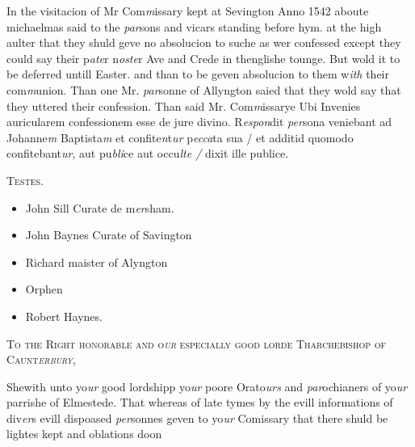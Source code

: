 \documentclass[12pt, a4paper]{book}
\begin{document}
            		
		\ifthenelse{\isodd{\thepage}}
		{\reversemarginpar}
		{\normalmarginpar}
		 In the visitacion of Mr Com\textit{m}issary kept at Sevington
 Anno 1542 aboute michaelmas said to the \textit{par}sons
 and vicars standing before hym. at the high aulter
 that they shuld geve no absolucion to suche as
 wer confessed except they could say their p\textit{ate}r n\textit{oste}r
 Ave and Crede in thenglishe tounge. But wold
  it to be deferred untill Easter. and than to be
 geven absolucion to them w\textit{ith} their com\textit{m}union.
            			Than one Mr. \textit{par}sonne of Allyngton saied that they
 wold say that they uttered their confession.
 Than said Mr. Com\textit{m}issarye Ubi Invenies
 auricularem confessionem esse de jure divino. R\textit{espon}dit
 \textit{per}sona veniebant ad Johanne\textit{m} Baptista\textit{m} et confite\textit{n}t\textit{ur}
 p\textit{ecca}ta sua / et additid quomodo confitebant\textit{ur}, aut
 pu\textit{bli}ce aut occu\textit{lte /} dixit ille publice.
            	

	\begin{center} {\scshape Testes.} \end{center}\begin{itemize}
		\item[]John Sill Curate de m\textit{er}sham.
		\item[]John Baynes Curate of Savington
		\item[]Richard maister of Alyngton
		\item[]Orphen
		\item[]Robert Haynes.\end{itemize}

 

            
            	
				\begin{center} \begin{large} {\scshape To the Right honorable and o\textit{ur} especially
            		good lorde Tharchebishop of Caunt\textit{erbury},
 } \end{large} \end{center}
			
 
 	
				\marginpar[\vspace{0.5cm}{\textcolor{Gray}{Elmested}}]{}
			
 	
		\ifthenelse{\isodd{\thepage}}
		{\reversemarginpar}
		{\normalmarginpar}
		Shewith unto yo\textit{ur} good lordshipp yo\textit{ur} poore Orato\textit{urs}
 and \textit{par}ochianers of yo\textit{ur} parrishe of Elmestede. That
 whereas of late tymes by the evill informations of
 div\textit{er}s evill dispoased \textit{per}sonnes geven to yo\textit{ur} Comissary
 that there shuld be lightes kept and oblations doon
\end{document}
